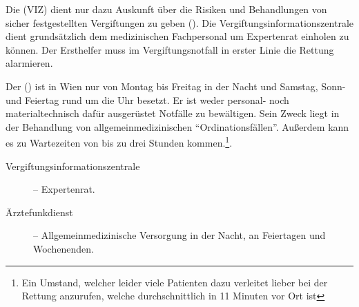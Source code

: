 
{
Die
 (VIZ) dient nur dazu
Auskunft über die Risiken und Behandlungen von sicher festgestellten Vergiftungen zu
geben (). Die
Vergiftungsinformationszentrale dient grundsätzlich dem
medizinischen Fachpersonal um Expertenrat einholen zu
können. Der Ersthelfer muss im Vergiftungsnotfall in
erster Linie die Rettung alarmieren.

Der  ()
ist in Wien nur von Montag bis Freitag in der Nacht und Samstag, Sonn- und
Feiertag rund um die Uhr besetzt. Er
ist weder personal- noch materialtechnisch dafür ausgerüstet
Notfälle zu bewältigen. Sein Zweck liegt in der
Behandlung von allgemeinmedizinischen
"`Ordinationsfällen"'. Außerdem kann es zu Wartezeiten von
bis zu drei Stunden kommen.\footnote{Ein Umstand,
welcher leider viele Patienten dazu verleitet lieber bei der Rettung anzurufen,
welche durchschnittlich in 11 Minuten vor Ort ist}. 
}{
\begin{description}
  \item[Vergiftungsinformationszentrale]  --
  Expertenrat.
  \item[Ärztefunkdienst]  -- Allgemeinmedizinische Versorgung in
  der Nacht, an Feiertagen und Wochenenden.
\end{description}
}{}{}{}




